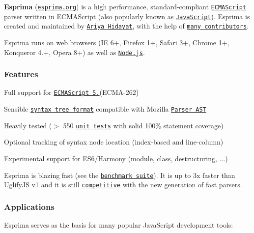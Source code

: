 {\bfseries Esprima} (\href{http://esprima.org}{\tt esprima.\+org}) is a high performance, standard-\/compliant \href{http://www.ecma-international.org/publications/standards/Ecma-262.htm}{\tt E\+C\+M\+A\+Script} parser written in E\+C\+M\+A\+Script (also popularly known as \href{http://en.wikipedia.org/wiki/JavaScript>JavaScript}{\tt Java\+Script}). Esprima is created and maintained by \href{http://twitter.com/ariyahidayat}{\tt Ariya Hidayat}, with the help of \href{https://github.com/ariya/esprima/contributors}{\tt many contributors}.

Esprima runs on web browsers (I\+E 6+, Firefox 1+, Safari 3+, Chrome 1+, Konqueror 4.+, Opera 8+) as well as \href{http://nodejs.org}{\tt Node.\+js}.

\subsubsection*{Features}


\begin{DoxyItemize}
\item Full support for \href{http://www.ecma-international.org/publications/standards/Ecma-262.htm}{\tt E\+C\+M\+A\+Script 5.}(E\+C\+M\+A-\/262)
\item Sensible \href{http://esprima.org/doc/index.html#ast}{\tt syntax tree format} compatible with Mozilla \href{https://developer.mozilla.org/en/SpiderMonkey/Parser_API}{\tt Parser A\+S\+T}
\item Heavily tested ($>$ 550 \href{http://esprima.org/test/}{\tt unit tests} with solid 100\% statement coverage)
\item Optional tracking of syntax node location (index-\/based and line-\/column)
\item Experimental support for E\+S6/\+Harmony (module, class, destructuring, ...)
\end{DoxyItemize}

Esprima is blazing fast (see the \href{http://esprima.org/test/benchmarks.html}{\tt benchmark suite}). It is up to 3x faster than Uglify\+J\+S v1 and it is still \href{http://esprima.org/test/compare.html}{\tt competitive} with the new generation of fast parsers.

\subsubsection*{Applications}

Esprima serves as the basis for many popular Java\+Script development tools\+:


